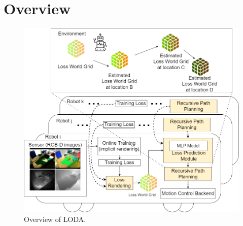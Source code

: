 \section{Overview\label{overview}}


\begin{figure}[h]
    \centering
    \vspace{-0.4cm}
    \includegraphics[width=\linewidth]{fig/overview.drawio.png}
    \caption{Overview of LODA.%
    }
    \label{fig:overview}
    \vspace{-0.5cm}
  \end{figure}





